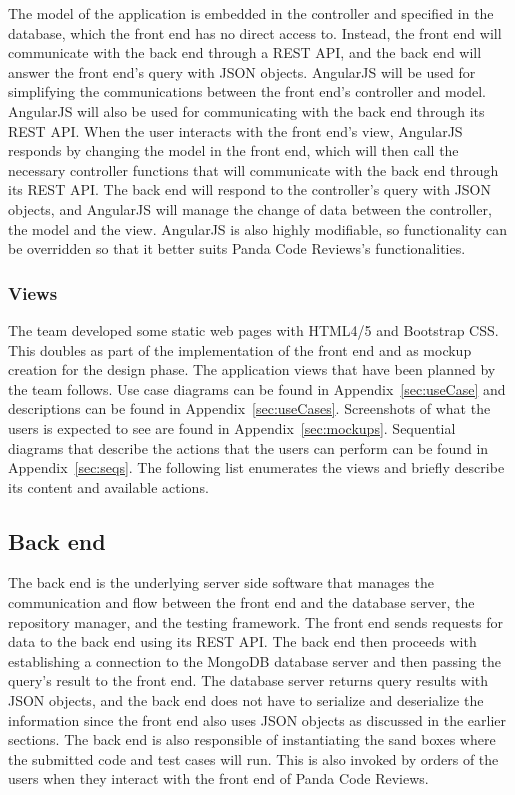 The model of the application is embedded in the controller and specified in the
database, which the front end has no direct access to. Instead, the front end
will communicate with the back end through a REST API, and the back end will
answer the front end's query with JSON objects. AngularJS will be used for
simplifying the communications between the front end's controller and model.
AngularJS will also be used for communicating with the back end through its REST
API. When the user interacts with the front end's view, AngularJS responds by
changing the model in the front end, which will then call the necessary
controller functions that will communicate with the back end through its REST
API. The back end will respond to the controller's query with JSON objects, and
AngularJS will manage the change of data between the controller, the model and
the view. AngularJS is also highly modifiable, so functionality can be
overridden so that it better suits Panda Code Reviews's functionalities.

\subsubsection{Views}

The team developed some static web pages with
HTML4/5 and Bootstrap CSS. This doubles as part of the implementation of the
front end and as mockup creation for the design phase. The application views
that have been planned by the team follows. Use case diagrams can be found in
Appendix~\ref{sec:useCase} and descriptions can be found in
Appendix~\ref{sec:useCases}. Screenshots of what the users is expected to see
are found in Appendix~\ref{sec:mockups}. Sequential diagrams that describe the
actions that the users can perform can be found in Appendix~\ref{sec:seqs}. The
following list enumerates the views and briefly describe its content and
available actions.

\subsection{Back end}

The back end is the underlying server side software that manages the
communication and flow between the front end and the database server, the
repository manager, and the testing framework. The front end sends requests for
data to the back end using its REST API. The back end then proceeds with
establishing a connection to the MongoDB\cite{mongodb} database server and then
passing the query's result to the front end. The database server returns query
results with JSON objects, and the back end does not have to serialize and
deserialize the information since the front end also uses JSON objects as
discussed in the earlier sections. The back end is also responsible of
instantiating the sand boxes where the submitted code and test cases will run.
This is also invoked by orders of the users when they interact with the front
end of Panda Code Reviews.

